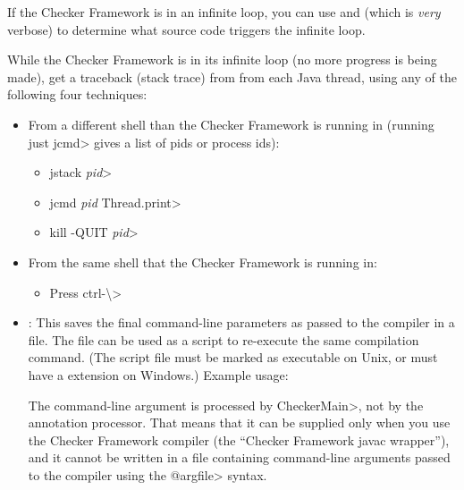 If the Checker Framework is in an infinite loop, you can use
 and  (which is \emph{very} verbose)
to determine what source code triggers the infinite loop.

While the Checker Framework is in its infinite loop (no more progress is
being made), get a traceback (stack trace) from from each Java thread,
using any of the following four techniques:

\begin{itemize}
  \item From a different shell than the Checker Framework is running in
    (running just \<jcmd> gives a list of pids or process ids):
  \begin{itemize}
    \item \<jstack \emph{pid}>
    \item \<jcmd \emph{pid} Thread.print>
    \item \<kill -QUIT \emph{pid}>
  \end{itemize}
  \item From the same shell that the Checker Framework is running in:
  \begin{itemize}
    \item Press \<ctrl-\textbackslash>
  \end{itemize}
\end{itemize}



\begin{itemize}

\item {}:
  This saves the final command-line parameters as passed to the compiler in a file.
  The file can be used as a script to re-execute the same compilation command.
  (The script file must be marked as executable on Unix, or
  must have a  extension on Windows.)
  Example usage: 

  The  command-line argument is processed by
  \<CheckerMain>, not by the annotation processor.  That means that it can be
  supplied only when you use the Checker Framework compiler (the ``Checker
  Framework javac wrapper''), and it cannot be written in a file containing
  command-line arguments passed to the compiler using the \<@argfile> syntax.

\end{itemize}

